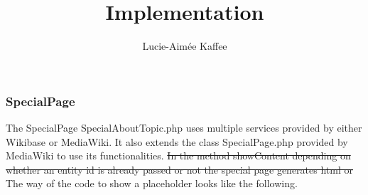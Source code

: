 \documentclass[11pt]{article}
\title {{Implementation}}
\author {Lucie-Aim\'{e}e Kaffee}
\date{}
\begin{document}
\subsubsection{SpecialPage}

The SpecialPage SpecialAboutTopic.php uses multiple services provided by either Wikibase or MediaWiki. It also extends the class SpecialPage.php provided by MediaWiki to use its functionalities.
\st{In the method showContent depending on whether an entity id is already passed or not the special page generates html or} \\
The way of the code to show a placeholder looks like the following. \\


\end{document}
